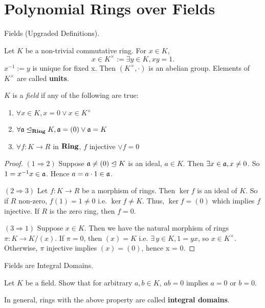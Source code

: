 \documentclass[../book.tex]{subfiles}
\begin{document}
\section{Polynomial Rings over Fields}
\begin{dfn} Fields (Upgraded Definitions).

    Let $K$ be a non-trivial commutative ring. 
    For $x \in K$, 
    \[
        x \in K^\times := \exists y \in K, xy = 1. 
    \]
    $x^{-1} := y$ is unique for fixed x. 
    Then $(K^\times, \cdot)$ is an abelian group. 
    Elements of $K^\times$ are called \textbf{units}. 

    $K$ is a \emph{field} if any of the following are true:
    \begin{enumerate}
        \item $\forall x \in K, x = 0 \lor x \in K^\times$
        \item $\forall \mathfrak{a} \trianglelefteq_{\mathbf{Ring}} K, \mathfrak{a} = (0) \lor \mathfrak{a} = K$
        \item $\forall f : K \to R$ in $\mathbf{Ring}$, $f$ injective $\lor f = 0$
    \end{enumerate}
\end{dfn}
\begin{proof} 
    $(1 \Rightarrow  2)$
    Suppose $\mathfrak{a} \neq (0) \trianglelefteq K$ is an ideal, $a \in K$. 
    Then $\exists x \in \mathfrak{a}, x \neq 0$.
    So $1 = x^{-1} x \in \mathfrak{a}$. 
    Hence $a = a\cdot1 \in \mathfrak{a}$. 

    $(2 \Rightarrow 3)$ 
    Let $f : K \to R$ be a morphism of rings. 
    Then $\ker f$ is an ideal of $K$. 
    So if $R$ non-zero, $f(1) = 1 \neq 0$ i.e. $\ker f \neq K$. 
    Thus, $\ker f = (0)$ which implies $f$ injective.  
    If $R$ is the zero ring, then $f = 0$. 

    $(3 \Rightarrow 1)$ 
    Suppose $x \in K$. 
    Then we have the natural morphism of rings $\pi : K \to K/(x)$. 
    If $\pi = 0$, then $(x) = K$ i.e. $\exists\,y \in K, 1 = yx$,
    so $x \in K^\times$. 
    Otherwise, $\pi$ injective implies $(x) = (0)$, hence x = 0. 
\end{proof}

\begin{ex} [Important] Fields are Integral Domains.
    
    Let $K$ be a field. 
    Show that for arbitrary $a, b \in K$, $ab = 0$ implies $a = 0$ or $b = 0$.
    
    In general, rings with the above property are called \textbf{integral domains}.
\end{ex}
\end{document}
